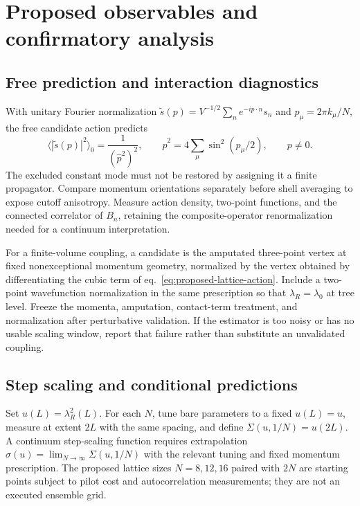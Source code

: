 \section{Proposed observables and confirmatory analysis}
\label{app:observables}

\subsection{Free prediction and interaction diagnostics}

With unitary Fourier normalization $\widetilde s(p)=V^{-1/2}\sum_n e^{-ip\cdot n}s_n$ and $p_\mu=2\pi k_\mu/N$, the free candidate action predicts
\begin{equation}
 \langle|\widetilde s(p)|^2\rangle_0=\frac{1}{(\widehat p^2)^2},
 \qquad\widehat p^2=4\sum_\mu\sin^2(p_\mu/2),\qquad p\ne0.
 \label{eq:free-lattice-prediction}
\end{equation}
The excluded constant mode must not be restored by assigning it a finite propagator.  Compare momentum orientations separately before shell averaging to expose cutoff anisotropy.  Measure action density, two-point functions, and the connected correlator of $B_n$, retaining the composite-operator renormalization needed for a continuum interpretation.

For a finite-volume coupling, a candidate is the amputated three-point vertex at fixed nonexceptional momentum geometry, normalized by the vertex obtained by differentiating the cubic term of eq.~\eqref{eq:proposed-lattice-action}.  Include a two-point wavefunction normalization in the same prescription so that $\lambda_R=\lambda_0$ at tree level.  Freeze the momenta, amputation, contact-term treatment, and normalization after perturbative validation.  If the estimator is too noisy or has no usable scaling window, report that failure rather than substitute an unvalidated coupling.

\subsection{Step scaling and conditional predictions}

Set $u(L)=\lambda_R^2(L)$.  For each $N$, tune bare parameters to a fixed $u(L)=u$, measure at extent $2L$ with the same spacing, and define $\Sigma(u,1/N)=u(2L)$.  A continuum step-scaling function requires extrapolation $\sigma(u)=\lim_{N\to\infty}\Sigma(u,1/N)$ with the relevant tuning and fixed momentum prescription.  The proposed lattice sizes $N=8,12,16$ paired with $2N$ are starting points subject to pilot cost and autocorrelation measurements; they are not an executed ensemble grid.

